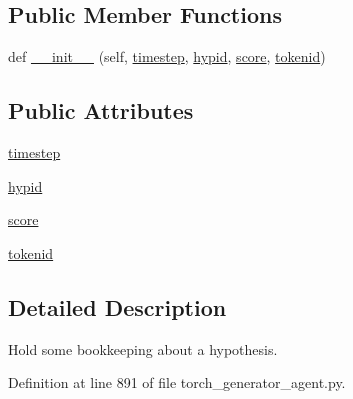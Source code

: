 \subsection*{Public Member Functions}
\begin{DoxyCompactItemize}
\item 
def \hyperlink{classparlai_1_1core_1_1torch__generator__agent_1_1__HypothesisTail_a126c399a12a4e57d6dffaf78a27f129c}{\+\_\+\+\_\+init\+\_\+\+\_\+} (self, \hyperlink{classparlai_1_1core_1_1torch__generator__agent_1_1__HypothesisTail_a93efff1b214a2d98848f8b3d4bf59367}{timestep}, \hyperlink{classparlai_1_1core_1_1torch__generator__agent_1_1__HypothesisTail_a4957647a4492d6cdca0c2f61cce123d5}{hypid}, \hyperlink{classparlai_1_1core_1_1torch__generator__agent_1_1__HypothesisTail_a40f7d1630bf982c5206d8f3a86fd1d3c}{score}, \hyperlink{classparlai_1_1core_1_1torch__generator__agent_1_1__HypothesisTail_a354a80abd13b7da3fd1d116c639a4f1a}{tokenid})
\end{DoxyCompactItemize}
\subsection*{Public Attributes}
\begin{DoxyCompactItemize}
\item 
\hyperlink{classparlai_1_1core_1_1torch__generator__agent_1_1__HypothesisTail_a93efff1b214a2d98848f8b3d4bf59367}{timestep}
\item 
\hyperlink{classparlai_1_1core_1_1torch__generator__agent_1_1__HypothesisTail_a4957647a4492d6cdca0c2f61cce123d5}{hypid}
\item 
\hyperlink{classparlai_1_1core_1_1torch__generator__agent_1_1__HypothesisTail_a40f7d1630bf982c5206d8f3a86fd1d3c}{score}
\item 
\hyperlink{classparlai_1_1core_1_1torch__generator__agent_1_1__HypothesisTail_a354a80abd13b7da3fd1d116c639a4f1a}{tokenid}
\end{DoxyCompactItemize}


\subsection{Detailed Description}
\begin{DoxyVerb}Hold some bookkeeping about a hypothesis.
\end{DoxyVerb}
 

Definition at line 891 of file torch\+\_\+generator\+\_\+agent.\+py.



